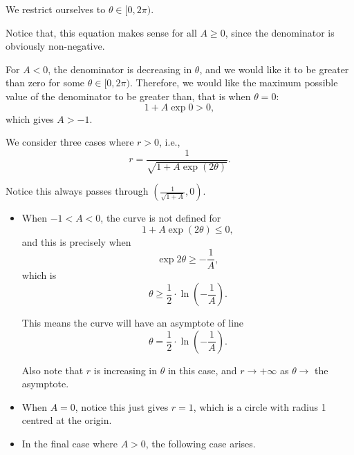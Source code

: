 \begin{enumerate}
          We restrict ourselves to \(\theta \in [0, 2\pi)\).

          Notice that, this equation makes sense for all \(A \geq 0\), since the denominator is obviously non-negative.

          For \(A < 0\), the denominator is decreasing in \(\theta\), and we would like it to be greater than zero for some \(\theta \in [0, 2\pi)\). Therefore, we would like the maximum possible value of the denominator to be greater than, that is when \(\theta = 0\):
          \[
              1 + A \exp 0 > 0,
          \]
          which gives \(A > -1\).

          We consider three cases where \(r > 0\), i.e.,
          \[
              r = \frac{1}{\sqrt{1 + A \exp(2\theta)}}.
          \]

          Notice this always passes through \(\left(\frac{1}{\sqrt{1 + A}}, 0\right)\).

          \begin{itemize}
              \item When \(-1 < A < 0\), the curve is not defined for
                    \[
                        1 + A \exp (2\theta) \leq 0,
                    \]
                    and this is precisely when
                    \[
                        \exp 2\theta \geq -\frac{1}{A},
                    \]
                    which is
                    \[
                        \theta \geq \frac{1}{2} \cdot \ln\left(-\frac{1}{A}\right).
                    \]

                    This means the curve will have an asymptote of line
                    \[
                        \theta = \frac{1}{2} \cdot \ln\left(-\frac{1}{A}\right).
                    \]

                    Also note that \(r\) is increasing in \(\theta\) in this case, and \(r \to +\infty\) as \(\theta \to\) the asymptote.

                    \begin{center}
                        
                    \end{center}

              \item When \(A = 0\), notice this just gives \(r = 1\), which is a circle with radius 1 centred at the origin.

                    \begin{center}
                        
                    \end{center}

              \item In the final case where \(A > 0\), the following case arises.

                    \begin{center}
                        
                    \end{center}
          \end{itemize}
\end{enumerate}